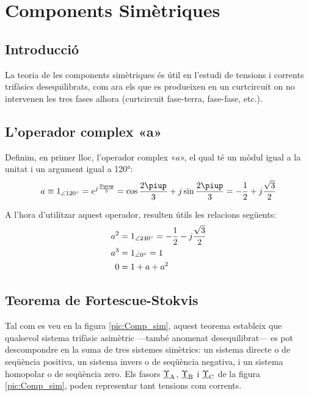 \chapter{Components Simètriques}  \label{sec:ch-comp-sim}

\section{Introducció}
La teoria de les components simètriques és útil en l'estudi de
tensions i corrents trifàsics
 desequilibrats, com ara els que es produeixen en un curtcircuit on no intervenen les tres
 fases alhora (curtcircuit fase-terra, fase-fase, etc.).

\section{L'operador complex «a»}

Definim, en primer lloc, l'operador complex «$a$», el qual té un mòdul
igual a la unitat i un argument igual a \ang{120}: \begin{equation}
   a \equiv \numpd{1}{120} = e^{j\frac{2\piup}{3}} =
   \cos \frac{2\piup}{3} + j \sin \frac{2\piup}{3} = - \frac{1}{2} + j \frac{\sqrt{3}}{2}
\end{equation}

A l'hora d'utilitzar aquest operador, resulten útils les relacions
següents:
\begin{subequations}
\begin{align}
    a^2 &= \num{1}_{\angle\ang{240}}= - \frac{1}{2} - j \frac{\sqrt{3}}{2} \\
    a^3 &= \num{1}_{\angle\ang{0}} = 1 \\
    0 &= 1+ a + a^2
 \end{align}
\end{subequations}

\section{\texorpdfstring{Teorema de Fortescue-Stokvis}{Teorema de Fortescue-Stokvis}}

Tal com es veu en la figura \vref{pic:Comp_sim}, aquest teorema
estableix que qualsevol sistema trifàsic asimètric ---també anomenat
desequilibrat---  es pot descompondre  en la suma de tres sistemes
simètrics: un sistema directe o de seqüència positiva, un sistema
invers o de seqüència negativa, i un sistema homopolar o de
seqüència zero. Els fasors $\underline{\Upsilon}_\mathrm{A}$,
$\underline{\Upsilon}_\mathrm{B}$ i $\underline{\Upsilon}_\mathrm{C}$ de la figura \vref{pic:Comp_sim}, poden representar tant
tensions com corrents.

